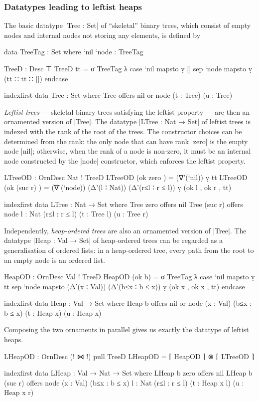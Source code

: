 \subsubsection{Datatypes leading to leftist heaps}

The basic datatype |Tree : Set| of ``skeletal'' binary trees, which consist of empty nodes and internal nodes not storing any elements, is defined by
\begin{code}
data TreeTag : Set where `nil `node : TreeTag

TreeD : Desc ⊤
TreeD tt = σ TreeTag λ  case  `nil   mapsto  ṿ []
                        sep   `node  mapsto  ṿ (tt ∷ tt ∷ []) endcase

indexfirst data Tree : Set where
  Tree  offers  nil
        or      node (t : Tree) (u : Tree)
\end{code}
\emph{Leftist trees} --- skeletal binary trees satisfying the leftist property --- are then an ornamented version of |Tree|.
The datatype |LTree : Nat → Set| of leftist trees is indexed with the rank of the root of the trees.
The constructor choices can be determined from the rank: the only node that can have rank |zero| is the empty node |nil|; otherwise, when the rank of a node is non-zero, it must be an internal node constructed by the |node| constructor, which enforces the leftist property.
\begin{code}
LTreeOD : OrnDesc Nat ! TreeD
LTreeOD (ok zero     )   =  (∇'(`nil)) ṿ tt
LTreeOD (ok (suc r)  )   =  (∇'(`node)) (Δ'(l ∶ Nat)) (Δ'(r≤l ∶ r ≤ l)) ṿ (ok l , ok r , tt)

indexfirst data LTree : Nat → Set where
  Tree zero     offers  nil
  Tree (suc r)  offers  node {l : Nat} (r≤l : r ≤ l) (t : Tree l) (u : Tree r)
\end{code}
Independently, \emph{heap-ordered trees} are also an ornamented version of |Tree|.
The datatype |Heap : Val → Set| of heap-ordered trees can be regarded as a generalisation of ordered lists: in a heap-ordered tree, every path from the root to an empty node is an ordered list.
\begin{code}
HeapOD : OrnDesc Val ! TreeD
HeapOD (ok b) =
  σ TreeTag  λ  case  `nil   mapsto  ṿ tt
                sep   `node  mapsto  (Δ'(x ∶ Val)) (Δ'(b≤x ∶ b ≤ x)) ṿ (ok x , ok x , tt) endcase

indexfirst data Heap : Val → Set where
  Heap b  offers  nil
          or      node (x : Val) (b≤x : b ≤ x) (t : Heap x) (u : Heap x)
\end{code}
Composing the two ornaments in parallel gives us exactly the datatype of leftist heaps.
\begin{code}
LHeapOD : OrnDesc (! ⋈ !) pull TreeD
LHeapOD = ⌈ HeapOD ⌉ ⊗ ⌈ LTreeOD ⌉

indexfirst data LHeap : Val → Nat → Set where
  LHeap b zero     offers  nil
  LHeap b (suc r)  offers  node  (x : Val) (b≤x : b ≤ x)
                                 {l : Nat} (r≤l : r ≤ l) (t : Heap x l) (u : Heap x r)
\end{code}

